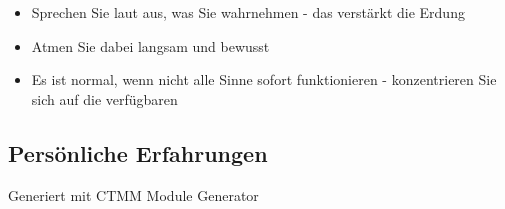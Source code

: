\begin{itemize}
    \item Sprechen Sie laut aus, was Sie wahrnehmen - das verstärkt die Erdung
    \item Atmen Sie dabei langsam und bewusst
    \item Es ist normal, wenn nicht alle Sinne sofort funktionieren - konzentrieren Sie sich auf die verfügbaren
\end{itemize}

\subsection{Persönliche Erfahrungen}


\vfill
\begin{center}
    \textcolor{ctmmGray}{\small Generiert mit CTMM Module Generator}
\end{center}

